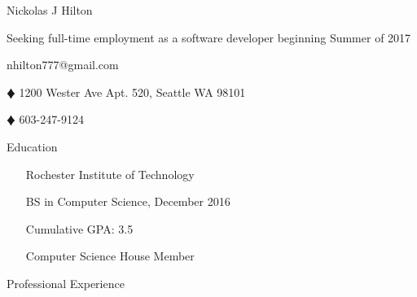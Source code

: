 \documentclass{article}
\newcommand{\lineseparator}[1]{\noindent\makebox[\linewidth]{\rule{\textwidth}{#1}}}
\begin{document}
\begin{minipage}[t]{0.4\textwidth}
  \hspace{-6.5mm}
  {\Huge Nickolas J Hilton }
\end{minipage}
\hspace{-6.5mm}
\begin{minipage}[b]{0.6\textwidth}
  \begin{flushright}
    {\small Seeking full-time employment as a software developer beginning Summer of 2017 }
  \end{flushright}
\end{minipage}
\vspace{1mm}
\lineseparator{1.5pt}
\vspace{-2mm}
\begin{center}
  nhilton777@gmail.com 
  \begin{inparaitem}
  \item[$\vardiamond$] 1200 Wester Ave Apt. 520, Seattle WA 98101
  \item[$\vardiamond$] 603-247-9124 
  \end{inparaitem}
\end{center}
\begin{minipage}[t]{1.0\textwidth}
  {\Large Education } 
\end{minipage}
\lineseparator{0.5pt}
\vspace{4mm}
\begin{minipage}[t]{0.5\textwidth}
  \vspace{0.5mm}
  \begin{itemize}[leftmargin=4mm]
    \item[] Rochester Institute of Technology  \vspace{-2mm}  
    \item[] BS in Computer Science, December 2016
  \end{itemize}
\end{minipage}
\begin{minipage}[t]{0.5\textwidth}
  \vspace{0.5mm}
  \begin{itemize}[leftmargin=4mm]
    \item[] Cumulative GPA: 3.5 \vspace{-2mm}  
    \item[] Computer Science House Member  
  \end{itemize}
\end{minipage}
{\Large Professional Experience } \\
\lineseparator{0.5pt}
\\[4mm]
\end{document}
